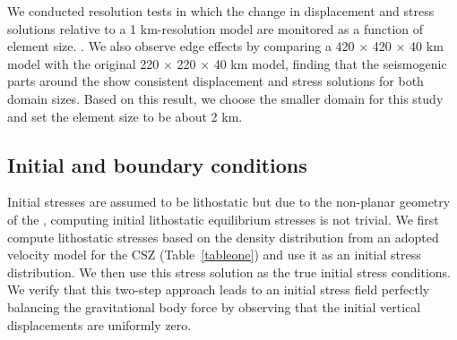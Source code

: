 \documentclass[draft]{agujournal2018}
\begin{document}
We conducted resolution tests in which the change in displacement and stress solutions relative to a 1 km-resolution model are monitored as a function of element size. .  We also observe edge effects by comparing a 420 $\times$ 420 $\times$ 40 km model with the original 220 $\times$ 220 $\times$ 40 km model, finding that the seismogenic parts around the  show consistent displacement and stress solutions for both domain sizes. Based on this result, we choose the smaller domain for this study and set the element size to be about 2 km. 



\subsection{Initial and boundary conditions}
\label{Initial_and_boundary_conditions}
Initial stresses are assumed to be lithostatic but due to the non-planar geometry of the , computing initial lithostatic equilibrium stresses is not trivial. We first compute lithostatic stresses based on the density distribution from an adopted velocity model for the CSZ (Table~\ref{tableone}) and use it as an initial stress distribution. We then use this stress solution as the true initial stress conditions. We verify that this two-step approach leads to an initial stress field perfectly balancing the gravitational body force by observing that the initial vertical displacements are uniformly zero.
\end{document}
